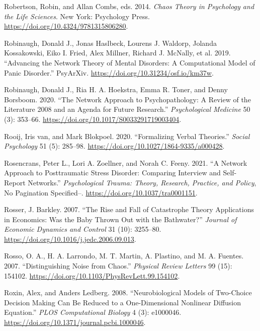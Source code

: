 \documentclass[
  a4paper,
  DIV=11,
  numbers=noendperiod,
  oneside]{scrreprt}
\newlength{\cslhangindent}
\newenvironment{CSLReferences}[2] %
 {\begin{list}{}{%
  \setlength{\itemindent}{0pt}
  \setlength{\leftmargin}{0pt}
  \setlength{\parsep}{0pt}
  \ifodd #1
   \setlength{\leftmargin}{\cslhangindent}
   \setlength{\itemindent}{-1\cslhangindent}
  \fi
  \setlength{\itemsep}{#2\baselineskip}}}
 {\end{list}}
\begin{document}
\begin{CSLReferences}{1}{0}
Robertson, Robin, and Allan Combs, eds. 2014. \emph{Chaos Theory in
{Psychology} and the {Life Sciences}}. {New York}: {Psychology Press}.
\url{https://doi.org/10.4324/9781315806280}.

Robinaugh, Donald J., Jonas Haslbeck, Lourens J. Waldorp, Jolanda
Kossakowski, Eiko I. Fried, Alex Millner, Richard J. McNally, et al.
2019. {``Advancing the {Network Theory} of {Mental Disorders}: {A
Computational Model} of {Panic Disorder}.''} {PsyArXiv}.
\url{https://doi.org/10.31234/osf.io/km37w}.

Robinaugh, Donald J., Ria H. A. Hoekstra, Emma R. Toner, and Denny
Borsboom. 2020. {``The Network Approach to Psychopathology: A Review of
the Literature 2008 and an Agenda for Future
Research.''} \emph{Psychological Medicine} 50 (3): 353--66.
\url{https://doi.org/10.1017/S0033291719003404}.

Rooij, Iris van, and Mark Blokpoel. 2020. {``Formalizing Verbal
Theories.''} \emph{Social Psychology} 51 (5): 285--98.
\url{https://doi.org/10.1027/1864-9335/a000428}.

Rosencrans, Peter L., Lori A. Zoellner, and Norah C. Feeny. 2021. {``A
Network Approach to Posttraumatic Stress Disorder: {Comparing} Interview
and Self-Report Networks.''} \emph{Psychological Trauma: Theory,
Research, Practice, and Policy}, No Pagination Specified--.
\url{https://doi.org/10.1037/tra0001151}.

Rosser, J. Barkley. 2007. {``The Rise and Fall of Catastrophe Theory
Applications in Economics: {Was} the Baby Thrown Out with the
Bathwater?''} \emph{Journal of Economic Dynamics and Control} 31 (10):
3255--80. \url{https://doi.org/10.1016/j.jedc.2006.09.013}.

Rosso, O. A., H. A. Larrondo, M. T. Martin, A. Plastino, and M. A.
Fuentes. 2007. {``Distinguishing Noise from Chaos.''} \emph{Physical
Review Letters} 99 (15): 154102.
\url{https://doi.org/10.1103/PhysRevLett.99.154102}.

Roxin, Alex, and Anders Ledberg. 2008. {``Neurobiological {Models} of
{Two-Choice Decision Making Can Be Reduced} to a {One-Dimensional
Nonlinear Diffusion Equation}.''} \emph{PLOS Computational Biology} 4
(3): e1000046. \url{https://doi.org/10.1371/journal.pcbi.1000046}.


\end{CSLReferences}
\end{document}
